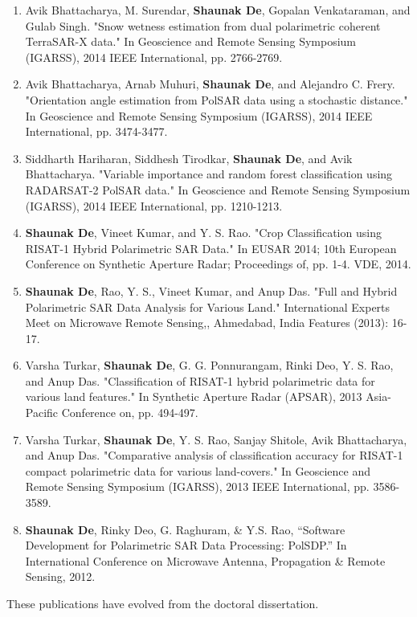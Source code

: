 \documentclass[12pt, a4paper]{article}
\begin{document}
{\begin{enumerate}
\item Avik Bhattacharya, M. Surendar, \textbf{Shaunak De}, Gopalan Venkataraman, and Gulab Singh. "Snow wetness estimation from dual polarimetric coherent TerraSAR-X data." In Geoscience and Remote Sensing Symposium (IGARSS), 2014 IEEE International, pp. 2766-2769.

\item Avik Bhattacharya, Arnab Muhuri, \textbf{Shaunak De}, and Alejandro C. Frery. "Orientation angle estimation from PolSAR data using a stochastic distance." In Geoscience and Remote Sensing Symposium (IGARSS), 2014 IEEE International, pp. 3474-3477. 

\item Siddharth Hariharan, Siddhesh Tirodkar, \textbf{Shaunak De}, and Avik Bhattacharya. "Variable importance and random forest classification using RADARSAT-2 PolSAR data." In Geoscience and Remote Sensing Symposium (IGARSS), 2014 IEEE International, pp. 1210-1213. 

\item \textbf{Shaunak De}, Vineet Kumar, and Y. S. Rao. "Crop Classification using RISAT-1 Hybrid Polarimetric SAR Data." In EUSAR 2014; 10th European Conference on Synthetic Aperture Radar; Proceedings of, pp. 1-4. VDE, 2014.

\item \textbf{Shaunak De}, Rao, Y. S., Vineet Kumar, and Anup Das. "Full and Hybrid Polarimetric SAR Data Analysis for Various Land." International Experts Meet on Microwave Remote Sensing,, Ahmedabad, India Features (2013): 16-17.

\item Varsha Turkar, \textbf{Shaunak De}, G. G. Ponnurangam, Rinki Deo, Y. S. Rao, and Anup Das. "Classification of RISAT-1 hybrid polarimetric data for various land features." In Synthetic Aperture Radar (APSAR), 2013 Asia-Pacific Conference on, pp. 494-497. 

\item Varsha Turkar, \textbf{Shaunak De}, Y. S. Rao, Sanjay Shitole, Avik Bhattacharya, and Anup Das. "Comparative analysis of classification accuracy for RISAT-1 compact polarimetric data for various land-covers." In Geoscience and Remote Sensing Symposium (IGARSS), 2013 IEEE International, pp. 3586-3589. 

\item \textbf{Shaunak De}, Rinky Deo, G. Raghuram, \& Y.S. Rao, “Software Development for Polarimetric SAR Data Processing: PolSDP.” In International Conference on Microwave Antenna, Propagation \& Remote Sensing, 2012.


\end{enumerate}
}
\vspace{1cm}
\begin{center}
\quad These publications have evolved from the doctoral dissertation.
\end{center}
\end{document}
